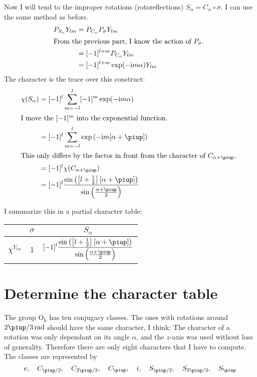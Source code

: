 \documentclass[11pt, english, fleqn, DIV=15, headinclude, BCOR=1cm]{scrartcl}
\begin{document}
Now I will tend to the improper rotations (rotoreflections) $S_\alpha =
C_\alpha \circ \sigma$. I can use the same method as before.
\begin{align*}
    P_{S_\alpha} Y_{lm}
    &= P_{C_\alpha} P_\sigma Y_{lm} \\
    \intertext{%
        From the previous part, I know the action of $P_\sigma$.
    }
    &= [-1]^{l+m} P_{C_\alpha} Y_{lm} \\
    &= [-1]^{l+m} \exp(-\iup m \alpha) Y_{lm}
\end{align*}
The character is the trace over this construct:
\begin{align*}
    \chi(S_\alpha)
    &= [-1]^l \sum_{m=-l}^l [-1]^m \exp(-\iup m \alpha) \\
    \intertext{%
        I move the $[-1]^m$ into the exponential function.
    }
    &= [-1]^l \sum_{m=-l}^l \exp\del{-\iup m [\alpha+\piup]} \\
    \intertext{%
        This only differs by the factor in front from the character of
        $C_{\alpha+\piup}$.
    }
    &= [-1]^l \chi(C_{\alpha+\piup}) \\
    &= [-1]^l \frac{\sin\del{\sbr{l + \frac12}[\alpha +
    \piup]}}{\sin\del{\frac{\alpha+\piup}2}}
\end{align*}

I summarize this in a partial character table:

\begin{tabular}{c|cc}
    & $\sigma$ & $S_\alpha$ \\
    \midrule
    $\chi^{Y_{lm}}$ & $1$ & $\displaystyle
    [-1]^l \frac{\sin\del{\sbr{l + \frac12}[\alpha +
    \piup]}}{\sin\del{\frac{\alpha+\piup}2}}
    $
\end{tabular}

\section{Determine the character table}

The group $\mathrm{O_h}$ has ten conjugacy classes. The ones with rotations
around ${2\piup/3}\,\si{\radian}$ should have the same character, I think: The
character of a rotation was only dependant on its angle $\alpha$, and the
$z$-axis was used without loss of generality. Therefore there are only eight
characters that I have to compute. The classes are represented by
\[
    e
    \eqnsep
    C_{\piup/2}
    \eqnsep
    C_{2\piup/3}
    \eqnsep
    C_{\piup}
    \eqnsep
    i
    \eqnsep
    S_{\piup/2}
    \eqnsep
    S_{2\piup/3}
    \eqnsep
    S_{\piup}
\]
\end{document}
